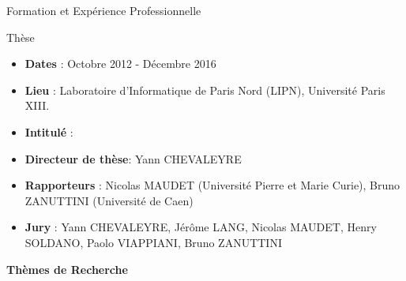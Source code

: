 \documentclass{beamer}
\newcommand{\imp}[1]{\textbf{{\color{blue}{#1}}}}
\begin{document}
{\begin{frame}{Formation et Expérience Professionnelle}
\end{frame}
\begin{frame}{Thèse}

\begin{itemize} 
\item \textbf{Dates} : Octobre 2012 - Décembre 2016
\item \textbf{Lieu} : Laboratoire d’Informatique de Paris Nord (LIPN),
Université Paris XIII.
\item \textbf{Intitulé} : \imp{Élicitation et planification dans les processus de
décision de Markov avec des récompenses inconnues}
\item \textbf{Directeur de thèse}: Yann CHEVALEYRE
\item \textbf{Rapporteurs} : Nicolas MAUDET (Université Pierre et
Marie Curie), Bruno ZANUTTINI (Université de Caen)
\item \textbf{Jury} : Yann CHEVALEYRE, Jérôme LANG, Nicolas
MAUDET, Henry SOLDANO, Paolo VIAPPIANI, Bruno
ZANUTTINI
\end{itemize}
	
\end{frame}

\begin{frame}
	\begin{center}
	\textbf{Thèmes de Recherche}
	\end{center}
\end{frame}
{


}}
\end{document}
